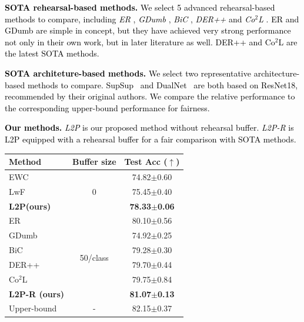 \documentclass[10pt,twocolumn,letterpaper]{article}
\newcommand{\zifeng}[1]{\textcolor{black}{#1}}
\newcommand{\cam}[1]{\textcolor{black}{#1}}
\newcommand{\methodabbr}{L2P\xspace}
\begin{document}
\zifeng{\textbf{\cam{SOTA rehearsal-based methods.}}}
\zifeng{We select 5 advanced rehearsal-based methods to compare, including \emph{ER} \cite{chaudhry2019tiny, hayes2019memory}, \emph{GDumb} \cite{prabhu2020gdumb}, \emph{BiC} \cite{wu2019large}, \emph{DER++} \cite{buzzega2020dark} and \emph{Co$^2$L} \cite{cha2021co2l}. ER and GDumb are simple in concept, but they have achieved very strong performance not only in their own work, but in later literature \cite{mai2021online, buzzega2020dark} as well. DER++ and Co$^2$L are the latest SOTA methods.}

\cam{\textbf{SOTA architeture-based methods.} We select two representative architecture-based methods to compare. SupSup~\cite{wortsman2020supermasks} and DualNet~\cite{pham2021dualnet} are both based on ResNet18, recommended by their original authors. We compare the relative performance to the corresponding upper-bound performance for fairness.
}

\zifeng{\textbf{Our methods.} \emph{\methodabbr} is our proposed method without rehearsal buffer. \emph{\methodabbr-R} is \methodabbr equipped with a rehearsal buffer for a fair comparison with SOTA methods.} 



\begin{table}
\small
\centering
{}
\vspace{-.2cm}
\label{table:domain-inc}
\begin{tabular}{l||c|c}
\toprule 
 \textbf{Method} & \textbf{Buffer size} & Test Acc ($\uparrow$)  \\
\toprule
EWC~\cite{kirkpatrick2017overcoming} & \multirow{3}{*}{0}  & 74.82\scriptsize{$\pm$0.60} \\
LwF~\cite{li2017learning} && 75.45\scriptsize{$\pm$0.40}  \\
\textbf{\methodabbr (ours)} && \bf{78.33\scriptsize{$\pm$0.06}} \\
\midrule
ER \cite{chaudhry2019tiny} &\multirow{6}{*}{50/class}& 80.10\scriptsize{$\pm$0.56}  \\
GDumb~\cite{prabhu2020gdumb} && 74.92\scriptsize{$\pm$0.25} \\
BiC~\cite{wu2019large} && 79.28\scriptsize{$\pm$0.30} \\
DER++~\cite{buzzega2020dark} && 79.70\scriptsize{$\pm$0.44} \\
Co$^2$L~\cite{cha2021co2l} && 79.75\scriptsize{$\pm$0.84} \\
\textbf{\methodabbr-R (ours)} && \bf{81.07\scriptsize{$\pm$0.13}} \\
\midrule
Upper-bound &-& 82.15\scriptsize{$\pm$0.37} \\
\bottomrule
\end{tabular}
\vspace{-5mm}
\end{table}
\end{document}
